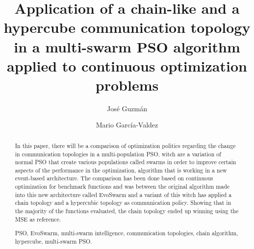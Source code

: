 \documentclass[runningheads]{llncs}
\newcommand{\keywords}[1]{\par\addvspace\baselineskip
\noindent\keywordname\enspace\ignorespaces#1}
\begin{document}
\mainmatter  %

\title{Application of a chain-like and a hypercube communication topology 
in a multi-swarm PSO algorithm applied to continuous optimization problems}


%
%
\author{José Guzmán \and Mario García-Valdez}





%
%

\toctitle{}

\maketitle


\begin{abstract}

In this paper, there will be a comparison of optimization politics regarding the
change in communication topologies in a multi-population PSO, witch are a variation of normal PSO that create various populations called swarms in order to improve certain aspects of the performance in the optimization, algorithm that is working in a new event-based architecture. The comparison has been done based on continuous optimization for benchmark functions and was between the original algorithm made into this new architecture called EvoSwarm and a variant of this witch has applied a chain topology and a hypercubic topology as communication policy. Showing that in the majority of the functions evaluated, the chain topology  ended up winning using the MSE as reference.

\keywords{PSO, EvoSwarm, multi-swarm intelligence, communication topologies,
 chain algorithm, hypercube, multi-swarm PSO.}
\end{abstract}
\end{document}
